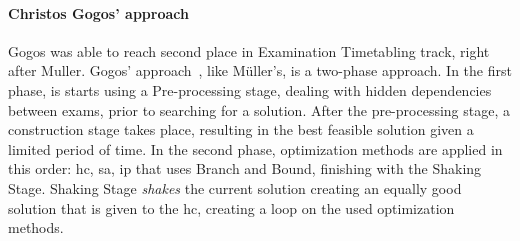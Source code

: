 
\paragraph{Christos Gogos' approach}

Gogos was able to reach second place in Examination Timetabling track, right after Muller. Gogos' approach~\cite{Gogos2012}, like M\"{u}ller's, is a two-phase approach. In the first phase, is starts using a Pre-processing stage, dealing with hidden dependencies between exams, prior to searching for a solution. After the pre-processing stage, a construction stage takes place, resulting in the best feasible solution given a limited period of time. In the second phase, optimization methods are applied in this order: \gls{hc}, \gls{sa}, \gls{ip} that uses Branch and Bound, finishing with the Shaking Stage. Shaking Stage \textit{shakes} the current solution creating an equally good solution that is given to the \gls{hc}, creating a loop on the used optimization methods.\\



